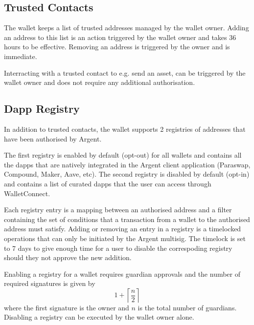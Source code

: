 \documentclass[12pt]{article}
\begin{document}
\subsection{Trusted Contacts}
\label{sec:trusted-contacts}

The wallet keeps a list of trusted addresses managed by the wallet owner.
Adding an address to this list is an action triggered by the wallet owner and takes 36 hours to be effective. Removing an address is triggered by the owner and is immediate.

Interracting with a trusted contact to e.g. send an asset, can be triggered by the wallet owner and does not require any additional authorisation. 

\subsection{Dapp Registry}
\label{sec:authorised-dapps}

In addition to trusted contacts, the wallet supports 2 registries of addresses that have been authorised by Argent.

The first registry is enabled by default (opt-out) for all wallets and contains all the dapps that are natively integrated in the Argent client application (Paraswap, Compound, Maker, Aave, etc). The second registry is disabled by default (opt-in) and contains a list of curated dapps that the user can access through WalletConnect.

Each registry entry is a mapping between an authorised address and a filter containing the set of conditions that a transaction from a wallet to the authorised address must satisfy.
Adding or removing an entry in a registry is a timelocked operations that can only be initiated by the Argent multisig.
The timelock is set to 7 days to give enough time for a user to disable the correspoding registry should they not approve the new addition. 

Enabling a registry for a wallet requires guardian approvals and the number of required signatures is given by
\begin{equation*}
    1+\left\lceil {\frac{n}{2}} \right\rceil
\end{equation*}
where the first signature is the owner and $n$ is the total number of guardians. Disabling a registry can be executed by the wallet owner alone.
\end{document}
